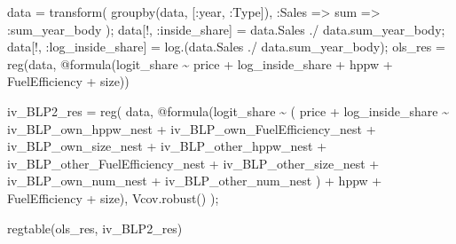 \documentclass[
  letterpaper,
  DIV=11,
  numbers=noendperiod]{scrreprt}
\newenvironment{Shaded}{\begin{snugshade}}{\end{snugshade}}
\newcommand{\DataTypeTok}[1]{\textcolor[rgb]{0.68,0.00,0.00}{#1}}
\newcommand{\FunctionTok}[1]{\textcolor[rgb]{0.28,0.35,0.67}{#1}}
\newcommand{\NormalTok}[1]{\textcolor[rgb]{0.00,0.23,0.31}{#1}}
\newcommand{\OperatorTok}[1]{\textcolor[rgb]{0.37,0.37,0.37}{#1}}
\newcommand{\PreprocessorTok}[1]{\textcolor[rgb]{0.68,0.00,0.00}{#1}}
\begin{document}
\begin{Shaded}
\begin{Highlighting}[]
\NormalTok{data }\OperatorTok{=} \FunctionTok{transform}\NormalTok{(}
    \FunctionTok{groupby}\NormalTok{(data, [}\OperatorTok{:}\NormalTok{year, }\OperatorTok{:}\DataTypeTok{Type}\NormalTok{]),}
    \OperatorTok{:}\NormalTok{Sales }\OperatorTok{=\textgreater{}}\NormalTok{ sum }\OperatorTok{=\textgreater{}} \OperatorTok{:}\NormalTok{sum\_year\_body}
\NormalTok{);}
\NormalTok{data[!, }\OperatorTok{:}\NormalTok{inside\_share] }\OperatorTok{=}\NormalTok{ data.Sales }\OperatorTok{./}\NormalTok{ data.sum\_year\_body;}
\NormalTok{data[!, }\OperatorTok{:}\NormalTok{log\_inside\_share] }\OperatorTok{=} \FunctionTok{log}\NormalTok{.(data.Sales }\OperatorTok{./}\NormalTok{ data.sum\_year\_body);}
\NormalTok{ols\_res }\OperatorTok{=} \FunctionTok{reg}\NormalTok{(data, }\PreprocessorTok{@formula}\NormalTok{(logit\_share }\OperatorTok{\textasciitilde{}}\NormalTok{ price }\OperatorTok{+}\NormalTok{ log\_inside\_share }\OperatorTok{+}\NormalTok{ hppw }\OperatorTok{+}\NormalTok{ FuelEfficiency }\OperatorTok{+}\NormalTok{ size))}

\NormalTok{iv\_BLP2\_res }\OperatorTok{=} \FunctionTok{reg}\NormalTok{(}
\NormalTok{    data, }
    \PreprocessorTok{@formula}\NormalTok{(logit\_share }\OperatorTok{\textasciitilde{}}\NormalTok{ (}
\NormalTok{        price }\OperatorTok{+}\NormalTok{ log\_inside\_share }\OperatorTok{\textasciitilde{}}\NormalTok{ iv\_BLP\_own\_hppw\_nest }\OperatorTok{+}\NormalTok{ iv\_BLP\_own\_FuelEfficiency\_nest }\OperatorTok{+}\NormalTok{ iv\_BLP\_own\_size\_nest }\OperatorTok{+} 
\NormalTok{            iv\_BLP\_other\_hppw\_nest }\OperatorTok{+}\NormalTok{ iv\_BLP\_other\_FuelEfficiency\_nest }\OperatorTok{+}\NormalTok{ iv\_BLP\_other\_size\_nest }\OperatorTok{+}
\NormalTok{            iv\_BLP\_own\_num\_nest }\OperatorTok{+}\NormalTok{ iv\_BLP\_other\_num\_nest}
\NormalTok{    ) }\OperatorTok{+}\NormalTok{ hppw }\OperatorTok{+}\NormalTok{ FuelEfficiency }\OperatorTok{+}\NormalTok{ size),}
\NormalTok{    Vcov.}\FunctionTok{robust}\NormalTok{()}
\NormalTok{);}

\FunctionTok{regtable}\NormalTok{(ols\_res, iv\_BLP2\_res)}
\end{Highlighting}
\end{Shaded}
\end{document}
